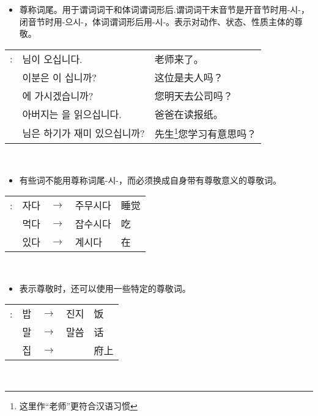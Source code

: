 \begin{grammar}
    \begin{grammarsect}[\kr -(으){}시-]\label{gram:si}
        \begin{itemize}
            \item 尊称词尾。用于谓词词干和体词谓词形后.谓词词干末音节是开音节时用{\kr -시-}，闭音节时用{\kr -으시-}，体词谓词形后用{\kr -시-}。表示对动作、状态、性质主体的尊敬。
        \end{itemize}
        \begin{tabular}{lll}
            \kr \ruby{例}{예}: &\kr \ruby{先生}{선생}님이 오십니다.&老师来了。\\
            &\kr 이분은 \ruby{夫人}{부인}이 십니까?&这位是夫人吗？\\ 
            &\kr \ruby{來日}{내일} \ruby{會社}{회사}에 가시겠습니까?&您明天去公司吗？\\
            &\kr 아버지는 \ruby{新聞}{신문}을 읽으십니다.&爸爸在读报纸。\\
            &\kr \ruby{先生}{선생}님은 \ruby{工夫}{공부}하기가 재미 있으십니까?&先生\footnote{这里作“老师”更符合汉语习惯}您学习有意思吗？
        \end{tabular}\\
        \begin{itemize}
            \item 有些词不能用尊称词尾{\kr -시-}，而必须换成自身带有尊敬意义的尊敬词。
        \end{itemize}
        \begin{tabular}{lllll}
            \kr \ruby{例}{예}: &\kr 자다&$\to$&\kr 주무시다&睡觉\\
            &\kr 먹다 &$\to$&\kr 잡수시다&吃\\
            &\kr 있다 &$\to$&\kr 계시다&在
        \end{tabular}\\
        \begin{itemize}
            \item 表示尊敬时，还可以使用一些特定的尊敬词。
        \end{itemize}
        \begin{tabular}{lllll}
            \kr \ruby{例}{예}: &\kr 밥&$\to$& \kr 진지& 饭\\
            &\kr 말&$\to$&\kr 말씀& 话\\
            &\kr 집&$\to$& \kr \ruby{宅}{댁}& 府上
        \end{tabular}\\
        \begin{itemize}

\end{itemize}
\end{grammarsect}
\end{grammar}
